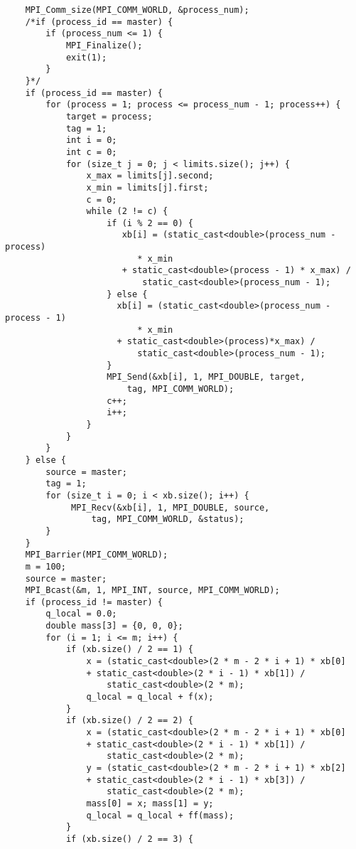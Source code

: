 \documentclass{report}
\begin{document}
\begin{lstlisting}
    MPI_Comm_size(MPI_COMM_WORLD, &process_num);
    /*if (process_id == master) {
        if (process_num <= 1) {
            MPI_Finalize();
            exit(1);
        }
    }*/
    if (process_id == master) {
        for (process = 1; process <= process_num - 1; process++) {
            target = process;
            tag = 1;
            int i = 0;
            int c = 0;
            for (size_t j = 0; j < limits.size(); j++) {
                x_max = limits[j].second;
                x_min = limits[j].first;
                c = 0;
                while (2 != c) {
                    if (i % 2 == 0) {
                       xb[i] = (static_cast<double>(process_num - process)
                          * x_min
                       + static_cast<double>(process - 1) * x_max) /
                           static_cast<double>(process_num - 1);
                    } else {
                      xb[i] = (static_cast<double>(process_num - process - 1)
                          * x_min
                      + static_cast<double>(process)*x_max) /
                          static_cast<double>(process_num - 1);
                    }
                    MPI_Send(&xb[i], 1, MPI_DOUBLE, target,
                        tag, MPI_COMM_WORLD);
                    c++;
                    i++;
                }
            }
        }
    } else {
        source = master;
        tag = 1;
        for (size_t i = 0; i < xb.size(); i++) {
             MPI_Recv(&xb[i], 1, MPI_DOUBLE, source,
                 tag, MPI_COMM_WORLD, &status);
        }
    }
    MPI_Barrier(MPI_COMM_WORLD);
    m = 100;
    source = master;
    MPI_Bcast(&m, 1, MPI_INT, source, MPI_COMM_WORLD);
    if (process_id != master) {
        q_local = 0.0;
        double mass[3] = {0, 0, 0};
        for (i = 1; i <= m; i++) {
            if (xb.size() / 2 == 1) {
                x = (static_cast<double>(2 * m - 2 * i + 1) * xb[0]
                + static_cast<double>(2 * i - 1) * xb[1]) /
                    static_cast<double>(2 * m);
                q_local = q_local + f(x);
            }
            if (xb.size() / 2 == 2) {
                x = (static_cast<double>(2 * m - 2 * i + 1) * xb[0]
                + static_cast<double>(2 * i - 1) * xb[1]) /
                    static_cast<double>(2 * m);
                y = (static_cast<double>(2 * m - 2 * i + 1) * xb[2]
                + static_cast<double>(2 * i - 1) * xb[3]) /
                    static_cast<double>(2 * m);
                mass[0] = x; mass[1] = y;
                q_local = q_local + ff(mass);
            }
            if (xb.size() / 2 == 3) {

\end{lstlisting}
\end{document}
